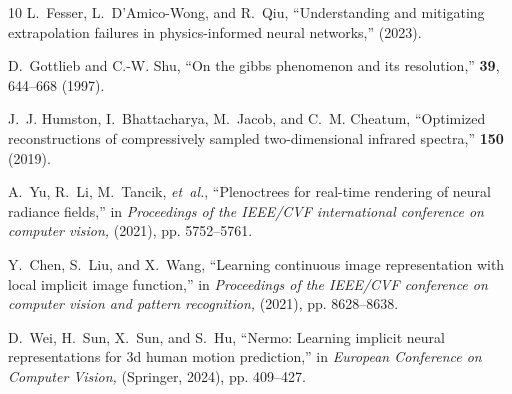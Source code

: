\documentclass{optica-article}
\begin{document}
\begin{thebibliography}{10}
L.~Fesser, L.~D'Amico-Wong, and R.~Qiu, \enquote{Understanding and mitigating extrapolation failures in physics-informed neural networks,} {\protect{}}  (2023).

D.~Gottlieb and C.-W. Shu, \enquote{On the gibbs phenomenon and its resolution,} {\protect{}} \textbf{39}, 644--668 (1997).

J.~J. Humston, I.~Bhattacharya, M.~Jacob, and C.~M. Cheatum, \enquote{Optimized reconstructions of compressively sampled two-dimensional infrared spectra,} {\protect{}} \textbf{150} (2019).

A.~Yu, R.~Li, M.~Tancik, \emph{et~al.}, \enquote{Plenoctrees for real-time rendering of neural radiance fields,} in \emph{Proceedings of the IEEE/CVF international conference on computer vision,}  (2021), pp. 5752--5761.

Y.~Chen, S.~Liu, and X.~Wang, \enquote{Learning continuous image representation with local implicit image function,} in \emph{Proceedings of the IEEE/CVF conference on computer vision and pattern recognition,}  (2021), pp. 8628--8638.

D.~Wei, H.~Sun, X.~Sun, and S.~Hu, \enquote{Nermo: Learning implicit neural representations for 3d human motion prediction,} in \emph{European Conference on Computer Vision,}  (Springer, 2024), pp. 409--427.

\end{thebibliography}





\end{document}
